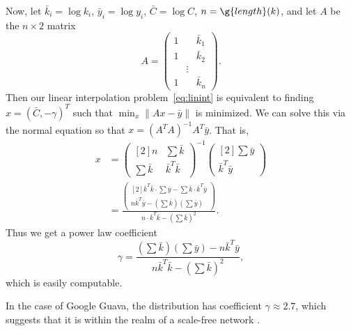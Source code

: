 \documentclass[11pt,a4paper,twocolumn]{article}
\begin{document}
\begin{singlespace}
Now, let $\bar{k}_i=\log k_i$, $\bar{y}_i=\log y_i$,
$\bar{C}=\log C$, $n=\g{length}(k)$, and let $A$ be the $n\times 2$ matrix
\[A=\begin{pmatrix}1&&\bar{k}_1\\ 1&&\bar{k}_2\\ &\vdots&\\ 1&&\bar{k}_n
\end{pmatrix}.\]
Then our linear interpolation problem~\eqref{eq:linint} is equivalent to finding
$x=\left(\bar{C},-\gamma\right)^T$ such that $\min_x \|Ax-\bar{y}\|$ is
minimized. We can solve this via the normal equation \cite{mcomp} so that
$x=\left(A^T A\right)^{-1} A^T\bar{y}$. That is,
\begin{align*}x&=\begin{pmatrix}[2]n&\sum \bar{k}\\
\sum \bar{k} & \bar{k}^T\bar{k}\end{pmatrix}^{-1}
\begin{pmatrix}[2]\sum \bar{y}\\ \bar{k}^T\bar{y}\end{pmatrix}\\
&=\frac{
\begin{pmatrix}[2]\bar{k}^T\bar{k}\cdot\sum\bar{y}-\sum\bar{k}\cdot
\bar{k}^T\bar{y}\\ n\bar{k}^T\bar{y}-\left(\sum \bar{k}\right)
\left(\sum\bar{y}\right)\end{pmatrix}
}{n\cdot\bar{k}^T\bar{k}-\left(\sum \bar{k}\right)^2}.\end{align*}
Thus we get a power law coefficient
\begin{equation} \label{eq:gamma}
\gamma=\frac{\left(\sum\bar{k}\right)\left(\sum \bar{y}\right)
-n\bar{k}^T\bar{y}}{n\bar{k}^T\bar{k}-\left(\sum \bar{k}\right)^2},
\end{equation}
which is easily computable.

In the case of Google Guava, the distribution has coefficient $\gamma\approx
2.7$, which suggests that it is within the realm of a scale-free network
\cite{CLASS}.



\printbibliography[title={References}]

\end{singlespace}
\end{document}
